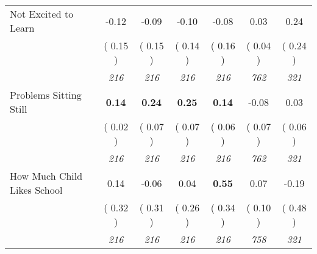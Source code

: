 \begin{tabular}{l c c c c c c}
Not Excited to Learn &     -0.12 &     -0.09 &     -0.10 &     -0.08 &      0.03 &      0.24 \\
& (     0.15 ) & (     0.15 ) & (     0.14 ) & (     0.16 ) & (     0.04 ) & (     0.24 ) \\
& \textit{ 216 } & \textit{ 216 } & \textit{ 216 } & \textit{ 216 } & \textit{ 762 } & \textit{ 321 } \\
Problems Sitting Still & \textbf{      0.14 } & \textbf{      0.24 } & \textbf{      0.25 } & \textbf{     0.14} &     -0.08 &      0.03 \\
& (     0.02 ) & (     0.07 ) & (     0.07 ) & (     0.06 ) & (     0.07 ) & (     0.06 ) \\
& \textit{ 216 } & \textit{ 216 } & \textit{ 216 } & \textit{ 216 } & \textit{ 762 } & \textit{ 321 } \\
How Much Child Likes School &      0.14 &     -0.06 &      0.04 & \textbf{     0.55} &      0.07 &     -0.19 \\
& (     0.32 ) & (     0.31 ) & (     0.26 ) & (     0.34 ) & (     0.10 ) & (     0.48 ) \\
& \textit{ 216 } & \textit{ 216 } & \textit{ 216 } & \textit{ 216 } & \textit{ 758 } & \textit{ 321 } \\
\bottomrule
\end{tabular}
